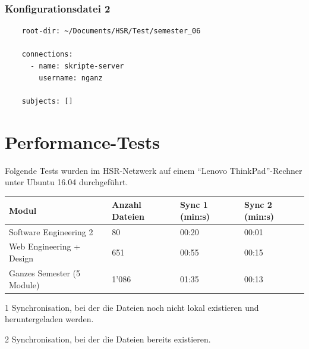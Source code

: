 \documentclass[a4paper]{article}
\let\oldsection\section
\renewcommand\section{\clearpage\oldsection}
\begin{document}
  \subsubsection{Konfigurationsdatei 2}

  \begin{verbatim}
    root-dir: ~/Documents/HSR/Test/semester_06

    connections:
      - name: skripte-server
        username: nganz

    subjects: []
  \end{verbatim}

  \section{Performance-Tests}

  Folgende Tests wurden im HSR-Netzwerk auf einem ``Lenovo ThinkPad''-Rechner unter Ubuntu 16.04 durchgeführt.

  \begin{threeparttable}
    \begin{tabulary}{\linewidth}{Llll}
      \toprule
      Modul & Anzahl Dateien & Sync 1 (min:s)  & Sync 2 (min:s)  \\
      \midrule
      Software Engineering 2 & 80 & 00:20 & 00:01 \\
      Web Engineering + Design & 651 & 00:55 & 00:15 \\
      Ganzes Semester (5 Module) & 1'086 & 01:35 & 00:13 \\
      \bottomrule
    \end{tabulary}

    \begin{tablenotes}
      \item[1] Synchronisation, bei der die Dateien noch nicht lokal existieren und heruntergeladen werden.
      \item[2] Synchronisation, bei der die Dateien bereits existieren.
    \end{tablenotes}
  \end{threeparttable}
\end{document}

